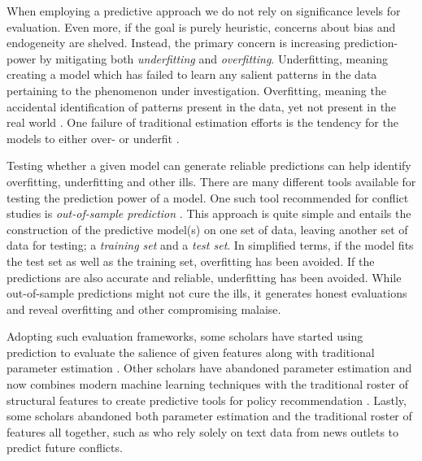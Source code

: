 \documentclass[a4paper]{article}
\begin{document}
When employing a predictive approach we do not rely on significance levels for evaluation. Even more, if the goal is purely heuristic, concerns about bias and endogeneity are shelved. Instead, the primary concern is increasing prediction-power by mitigating both \emph{underfitting} and \emph{overfitting}. Underfitting, meaning creating a model which has failed to learn any salient patterns in the data pertaining to the phenomenon under investigation. Overfitting, meaning the accidental identification of patterns present in the data, yet not present in the real world \citep[165-168]{Mcelreath_2018}. One failure of traditional estimation efforts is the tendency for the models to either over- or underfit \citep[364]{Ward_Greenhill_Bakke_2010}.\par 

Testing whether a given model can generate reliable predictions can help identify overfitting, underfitting and other ills. There are many different tools available for testing the prediction power of a model. One such tool recommended for conflict studies is \emph{out-of-sample prediction} \citep{king_zeng_2001b, Ward_Greenhill_Bakke_2010, perry_2013, Schrodt_2014}. This approach is quite simple and entails the construction of the predictive model(s) on one set of data, leaving another set of data for testing; a \emph{training set} and a \emph{test set}. In simplified terms, if the model fits the test set as well as the training set, overfitting has been avoided. If the predictions are also accurate and reliable, underfitting has been avoided. While out-of-sample predictions might not cure the ills, it generates honest evaluations and reveal overfitting and other compromising malaise.\par

Adopting such evaluation frameworks, some scholars have started using prediction to evaluate the salience of given features along with traditional parameter estimation \citep{Goldstone_2010}. Other scholars have abandoned parameter estimation and now combines modern machine learning techniques with the traditional roster of structural features to create predictive tools for policy recommendation \citep{perry_2013}. Lastly, some scholars abandoned both parameter estimation and the traditional roster of features all together, such as \cite{mueller_2016} who rely solely on text data from news outlets to predict future conflicts.\par
\end{document}
